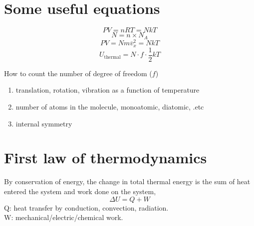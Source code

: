 

\section{Some useful equations} %
\begin{equation} \label{idealgas} PV = nRT = NkT \end{equation}
\begin{equation} \label{Avogadro} N = n \times N_A \end{equation}
\begin{equation} \label{PV-micro} PV = Nm{\overline v_x^2} = NkT \end{equation}
\begin{equation} \label{eqpartition} U_\text{thermal} = N \cdot f \cdot \frac{1}{2}kT \end{equation}

How to count the number of degree of freedom ($f$)
\begin{enumerate}
\item{translation, rotation, vibration as a function of temperature}
\item{number of atoms in the molecule, monoatomic, diatomic, .etc}
\item{internal symmetry}
\end{enumerate}

\section{First law of thermodynamics}
By conservation of energy, the change in total thermal energy is the sum of heat entered the system and work done on the system,
\begin{equation} \label{1st} \Delta{U} = Q + W \end{equation}
Q: heat transfer by conduction, convection, radiation.\\
W: mechanical/electric/chemical work. \\

